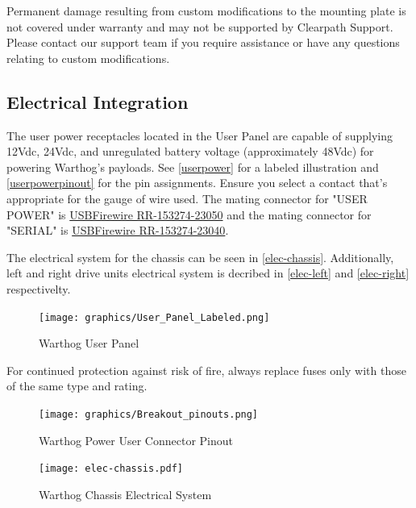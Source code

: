 \documentclass[]{clearpath-latex/clearpath-manual}
\begin{document}
\begin{warning}[]
Permanent damage resulting from custom modifications to the mounting plate is not covered under warranty and may not be supported by Clearpath Support.  Please contact our support team if you require assistance or have any questions relating to custom modifications.
\end{warning}


\pagebreak[4]
\subsection{Electrical Integration}
\label{electrical}

The user power receptacles located in the User Panel are capable of supplying 12Vdc, 24Vdc, and unregulated battery voltage (approximately 48Vdc) for powering Warthog's payloads. See \autoref{userpower} for a labeled illustration and \autoref{userpowerpinout} for the pin assignments. Ensure you select a contact that's appropriate for the gauge of wire used. The mating connector for "USER POWER" is \href{https://www.usbfirewire.com/parts/rr-153274-23050.html#RR-153274-23050}{USBFirewire RR-153274-23050} and the mating connector for "SERIAL" is \href{https://www.usbfirewire.com/parts/rr-153274-23040.html#RR-153274-23040}{USBFirewire RR-153274-23040}.

The electrical system for the chassis can be seen in \autoref{elec-chassis}. Additionally, left and right drive units electrical system is decribed in \autoref{elec-left} and \autoref{elec-right} respectivelty.





\begin{figure}[!h]
  \centering
  \texttt{[image: graphics/User\_Panel\_Labeled.png]}
  \caption{Warthog User Panel}
  \label{userpower}
\end{figure}


\begin{warning}
For continued protection against risk of fire, always replace fuses only with those of the same type and rating.
\end{warning}


\begin{figure}[!htb]
  \centering
  \texttt{[image: graphics/Breakout\_pinouts.png]}
  \caption{Warthog Power User Connector Pinout}
  \label{userpowerpinout}
\end{figure}

\pagebreak
\begin{figure}[!htb]
  \centering
  \texttt{[image: elec-chassis.pdf]}
  \caption{Warthog Chassis Electrical System}
  \label{elec-chassis}
\end{figure}
\end{document}
